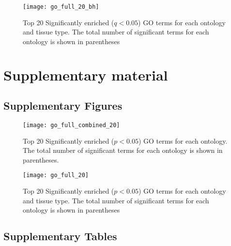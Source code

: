 \documentclass[11pt]{article}
\newcommand{\beginsupplement}{%
        \setcounter{table}{0}
        \renewcommand{\thetable}{S\arabic{table}}
        \setcounter{figure}{0}
        \renewcommand{\thefigure}{S\arabic{figure}}
        \renewcommand{\thesection}{S\arabic{section}}
        \renewcommand{\thesubsection}{S\arabic{subsection}} 
     }
\begin{document}
\begin{figure}[t]
  \centering
  \texttt{[image: go\_full\_20\_bh]}
  \caption{Top 20 Significantly enriched ($q < 0.05$) GO terms for
    each ontology and tissue type. The total number of significant
    terms for each ontology is shown in parentheses}
  \label{fig:go_tissue}
\end{figure}









\clearpage

\beginsupplement

\section*{Supplementary material}

\subsection*{Supplementary Figures}\label{ss:supp-fig}

\begin{figure}[t]
  \centering
  \texttt{[image: go\_full\_combined\_20]}
  \caption{Top 20 Significantly enriched ($p < 0.05$) GO terms for
    each ontology. The total number of significant terms for each
    ontology is shown in parentheses.}
  \label{fig:go_combined}
\end{figure}


\begin{figure}[t]
  \centering
  \texttt{[image: go\_full\_20]}
  \caption{Top 20 Significantly enriched ($p < 0.05$) GO terms for
    each ontology and tissue type. The total number of significant
    terms for each ontology is shown in parentheses}
  \label{fig:go_tissue}
\end{figure}
 
\clearpage

\subsection*{Supplementary Tables}\label{ss:supp-tab}

  
\clearpage

\clearpage

\clearpage
  
\clearpage

\clearpage

\end{document}
